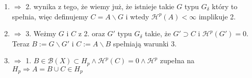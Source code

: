\begin{enumerate}
    \item $\Longrightarrow$ 2. wynika z tego, że wiemy już, że istnieje takie $G$ typu $G_{\delta}$ który to spełnia, więc definujemy $C = A \backslash G$ i wtedy $\mathcal{H}^p(A) < \infty$ implikuje 2.
    \item $\Longrightarrow$ 3. Weżmy $G$ i $C$ z 2. oraz $G'$ typu $G_{\delta}$ takie, że $G' \supset C$ i $\mathcal{H}^p(G') = 0$. Teraz $B:=G \backslash G'$ i $C:= A \backslash B$ spełniają warunki 3.
    \item $\Longrightarrow$ 1. $B \in \mathcal{B}(X) \subset H_p \wedge \mathcal{H}^p(C) = 0 \wedge \mathcal{H}^p$ zupełna na $H_p \Longrightarrow A = B \cup C \in H_p$
\end{enumerate}